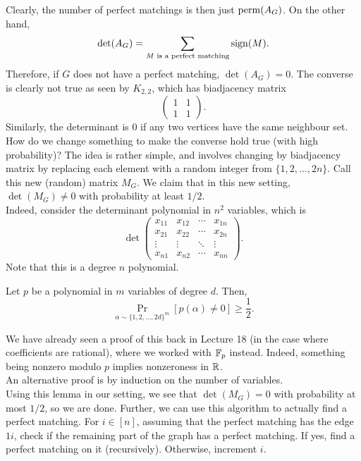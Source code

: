 		Clearly, the number of perfect matchings is then just $\operatorname{perm}(A_G)$. On the other hand,
		\[ \det(A_G) = \sum_{M \text{ is a perfect matching}} \operatorname{sign}(M). \]
		Therefore, if $G$ does not have a perfect matching, $\det(A_G) = 0$. The converse is clearly not true as seen by $K_{2,2}$, which has biadjacency matrix
		\[ \begin{pmatrix} 1 & 1 \\ 1 & 1 \end{pmatrix}. \]
		Similarly, the determinant is $0$ if any two vertices have the same neighbour set.\\
		How do we change something to make the converse hold true (with high probability)? The idea is rather simple, and involves changing by biadjacency matrix by replacing each element with a random integer from $\{1,2,\ldots,2n\}$. Call this new (random) matrix $M_G$. We claim that in this new setting, $\det(M_G) \ne 0$ with probability at least $1/2$.\\
		Indeed, consider the determinant polynomial in $n^2$ variables, which is
		\[ \det\begin{pmatrix} x_{11} & x_{12} & \cdots & x_{1n} \\ x_{21} & x_{22} & \cdots & x_{2n} \\ \vdots & \vdots & \ddots & \vdots \\ x_{n1} & x_{n2} & \cdots & x_{nn}  \end{pmatrix}. \]
		Note that this is a degree $n$ polynomial. 

		\begin{flem}
			Let $p$ be a polynomial in $m$ variables of degree $d$. Then,
			\[  \Pr_{\alpha \sim \{1,2,\ldots,2d\}^{m}} [p(\alpha) \ne 0] \ge \frac{1}{2}. \]
		\end{flem}
		We have already seen a proof of this back in Lecture 18 (in the case where coefficients are rational), where we worked with $\mathbb{F}_p$ instead. Indeed, something being nonzero modulo $p$ implies nonzeroness in $\mathbb{R}$.\\
		An alternative proof is by induction on the number of variables.\\

		Using this lemma in our setting, we see that $\det(M_G) = 0$ with probability at most $1/2$, so we are done. Further, we can use this algorithm to actually find a perfect matching. For $i \in [n]$, assuming that the perfect matching has the edge $1i$, check if the remaining part of the graph has a perfect matching. If yes, find a perfect matching on it (recursively). Otherwise, increment $i$.\\

